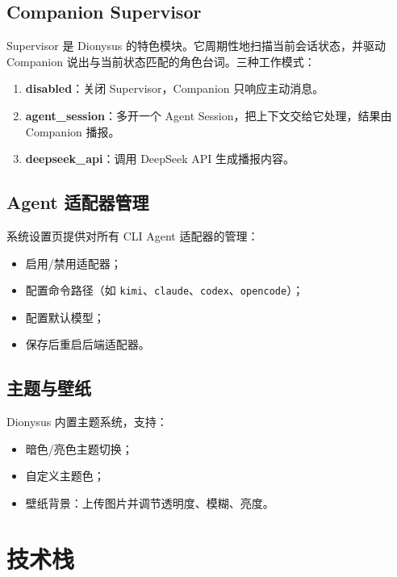 \documentclass[12pt,a4paper]{article}
\begin{document}
\subsection{Companion Supervisor}

Supervisor 是 Dionysus 的特色模块。它周期性地扫描当前会话状态，并驱动 Companion 说出与当前状态匹配的角色台词。三种工作模式：

\begin{enumerate}[leftmargin=2em]
  \item \textbf{disabled}：关闭 Supervisor，Companion 只响应主动消息。
  \item \textbf{agent\_session}：多开一个 Agent Session，把上下文交给它处理，结果由 Companion 播报。
  \item \textbf{deepseek\_api}：调用 DeepSeek API 生成播报内容。
\end{enumerate}

\subsection{Agent 适配器管理}

系统设置页提供对所有 CLI Agent 适配器的管理：

\begin{itemize}[leftmargin=2em]
  \item 启用/禁用适配器；
  \item 配置命令路径（如 \texttt{kimi}、\texttt{claude}、\texttt{codex}、\texttt{opencode}）；
  \item 配置默认模型；
  \item 保存后重启后端适配器。
\end{itemize}

\subsection{主题与壁纸}

Dionysus 内置主题系统，支持：

\begin{itemize}[leftmargin=2em]
  \item 暗色/亮色主题切换；
  \item 自定义主题色；
  \item 壁纸背景：上传图片并调节透明度、模糊、亮度。
\end{itemize}

\section{技术栈}
\end{document}
